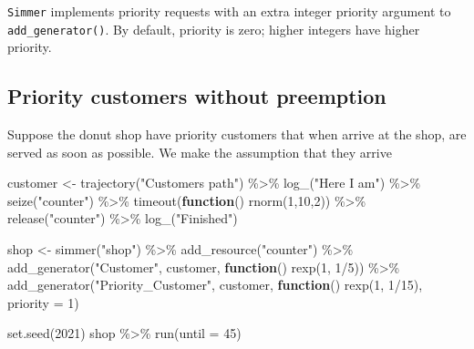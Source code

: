 \documentclass[
]{book}
\newenvironment{Shaded}{\begin{snugshade}}{\end{snugshade}}
\newcommand{\AttributeTok}[1]{\textcolor[rgb]{0.77,0.63,0.00}{#1}}
\newcommand{\ControlFlowTok}[1]{\textcolor[rgb]{0.13,0.29,0.53}{\textbf{#1}}}
\newcommand{\DecValTok}[1]{\textcolor[rgb]{0.00,0.00,0.81}{#1}}
\newcommand{\FunctionTok}[1]{\textcolor[rgb]{0.00,0.00,0.00}{#1}}
\newcommand{\NormalTok}[1]{#1}
\newcommand{\OtherTok}[1]{\textcolor[rgb]{0.56,0.35,0.01}{#1}}
\newcommand{\SpecialCharTok}[1]{\textcolor[rgb]{0.00,0.00,0.00}{#1}}
\newcommand{\StringTok}[1]{\textcolor[rgb]{0.31,0.60,0.02}{#1}}
\begin{document}
\texttt{Simmer} implements priority requests with an extra integer priority argument to \texttt{add\_generator()}. By default, priority is zero; higher integers have higher priority.

\hypertarget{priority-customers-without-preemption}{%
\subsection{Priority customers without preemption}\label{priority-customers-without-preemption}}

Suppose the donut shop have priority customers that when arrive at the shop, are served as soon as possible. We make the assumption that they arrive

\begin{Shaded}
\begin{Highlighting}[]
\NormalTok{customer }\OtherTok{\textless{}{-}}
  \FunctionTok{trajectory}\NormalTok{(}\StringTok{"Customer\textquotesingle{}s path"}\NormalTok{) }\SpecialCharTok{\%\textgreater{}\%}
  \FunctionTok{log\_}\NormalTok{(}\StringTok{"Here I am"}\NormalTok{) }\SpecialCharTok{\%\textgreater{}\%}
  \FunctionTok{seize}\NormalTok{(}\StringTok{"counter"}\NormalTok{) }\SpecialCharTok{\%\textgreater{}\%}
  \FunctionTok{timeout}\NormalTok{(}\ControlFlowTok{function}\NormalTok{() }\FunctionTok{rnorm}\NormalTok{(}\DecValTok{1}\NormalTok{,}\DecValTok{10}\NormalTok{,}\DecValTok{2}\NormalTok{)) }\SpecialCharTok{\%\textgreater{}\%}
  \FunctionTok{release}\NormalTok{(}\StringTok{"counter"}\NormalTok{) }\SpecialCharTok{\%\textgreater{}\%}
   \FunctionTok{log\_}\NormalTok{(}\StringTok{"Finished"}\NormalTok{)}

\NormalTok{shop }\OtherTok{\textless{}{-}}
  \FunctionTok{simmer}\NormalTok{(}\StringTok{"shop"}\NormalTok{) }\SpecialCharTok{\%\textgreater{}\%}
  \FunctionTok{add\_resource}\NormalTok{(}\StringTok{"counter"}\NormalTok{) }\SpecialCharTok{\%\textgreater{}\%}
  \FunctionTok{add\_generator}\NormalTok{(}\StringTok{"Customer"}\NormalTok{, customer, }\ControlFlowTok{function}\NormalTok{() }\FunctionTok{rexp}\NormalTok{(}\DecValTok{1}\NormalTok{, }\DecValTok{1}\SpecialCharTok{/}\DecValTok{5}\NormalTok{)) }\SpecialCharTok{\%\textgreater{}\%}
\FunctionTok{add\_generator}\NormalTok{(}\StringTok{"Priority\_Customer"}\NormalTok{, customer, }\ControlFlowTok{function}\NormalTok{() }\FunctionTok{rexp}\NormalTok{(}\DecValTok{1}\NormalTok{, }\DecValTok{1}\SpecialCharTok{/}\DecValTok{15}\NormalTok{), }\AttributeTok{priority =} \DecValTok{1}\NormalTok{)}

\FunctionTok{set.seed}\NormalTok{(}\DecValTok{2021}\NormalTok{)}
\NormalTok{shop }\SpecialCharTok{\%\textgreater{}\%} \FunctionTok{run}\NormalTok{(}\AttributeTok{until =} \DecValTok{45}\NormalTok{)}
\end{Highlighting}
\end{Shaded}
\end{document}
